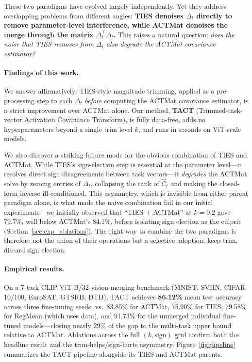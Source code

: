 \documentclass{article}
\theoremstyle{plain}
\theoremstyle{definition}
\theoremstyle{remark}
\begin{document}
These two paradigms have evolved largely independently. Yet they address overlapping problems from different angles: \textbf{TIES denoises $\Delta_t$ directly to remove parameter-level interference, while ACTMat denoises the merge through the matrix $\Delta_t^\top \Delta_t$.} This raises a natural question: \emph{does the noise that TIES removes from $\Delta_t$ also degrade the ACTMat covariance estimator?}

\paragraph{Findings of this work.} We answer affirmatively: TIES-style magnitude trimming, applied as a pre-processing step to each $\Delta_t$ \emph{before} computing the ACTMat covariance estimator, is a strict improvement over ACTMat alone. Our method, \textbf{TACT} (Trimmed-task-vector Activation Covariance Transform), is fully data-free, adds no hyperparameters beyond a single trim level $k$, and runs in seconds on ViT-scale models.

We also discover a striking failure mode for the obvious combination of TIES and ACTMat. While TIES's sign-election step is essential at the parameter level---it resolves direct sign disagreements between task vectors---it \emph{degrades} the ACTMat solve by zeroing entries of $\Delta_t$, collapsing the rank of $\hat{C}_t$ and making the closed-form inverse ill-conditioned. This asymmetry, which is invisible from either parent paradigm alone, is what made the naive combination fail in our initial experiments---we initially observed that ``TIES + ACTMat'' at $k=0.2$ gave 79.7\%, well below ACTMat's 84.1\%, before isolating sign election as the culprit (Section~\ref{sec:exp_ablations}). The right way to combine the two paradigms is therefore not the union of their operations but a selective adoption: keep trim, discard sign election.

\paragraph{Empirical results.} On a 7-task CLIP ViT-B/32 vision merging benchmark (MNIST, SVHN, CIFAR-10/100, EuroSAT, GTSRB, DTD), TACT achieves \textbf{86.12\%} mean test accuracy across three fine-tuning seeds, vs.\ 83.85\% for ACTMat, 75.90\% for TIES, 79.58\% for RegMean (which uses data), and 91.73\% for the unmerged individual fine-tuned models---closing nearly $29\%$ of the gap to the multi-task upper bound relative to ACTMat. Ablations across the full $(k, \mathrm{sign})$ grid confirm both the headline result and the trim-helps/sign-hurts asymmetry. Figure~\ref{fig:pipeline} summarizes the TACT pipeline alongside its TIES and ACTMat parents.
\end{document}
